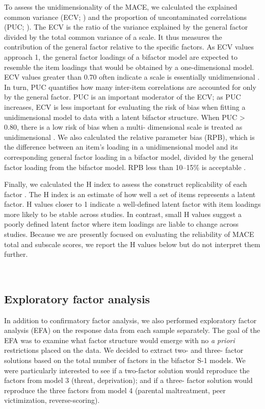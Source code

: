 \documentclass[letterpaper,man,natbib,noextraspace,floatsintext,longtable]{apa6}
\begin{document}
To assess the unidimensionality of the MACE, we calculated the explained common variance (ECV; \citealt{sijtsma2009use}) and the proportion of uncontaminated correlations (PUC; \citealt{reise2013multidimensionality}). The ECV is the ratio of the variance explained by the general factor divided by the total common variance of a scale. It thus measures the contribution of the general factor relative to the specific factors. As ECV values approach 1, the general factor loadings of a bifactor model are expected to resemble the item loadings that would be obtained by a one-dimensional model. ECV values greater than 0.70 often indicate a scale is essentially unidimensional \citep{rodriguez2016applying}. In turn, PUC quantifies how many inter-item correlations are accounted for only by the general factor. PUC is an important moderator of the ECV; as PUC increases, ECV is less important for evaluating the risk of bias when fitting a unidimensional model to data with a latent bifactor structure. When PUC > 0.80, there is a low risk of bias when a multi- dimensional scale is treated as unidimensional \citep{reise2013multidimensionality}. We also calculated the relative parameter bias (RPB), which is the difference between an item's loading in a unidimensional model and its corresponding general factor loading in a bifactor model, divided by the general factor loading from the bifactor model. RPB less than 10–15\% is acceptable \citep{muthen1987structural}.

Finally, we calculated the H index to assess the construct replicability of each factor \citep{hancock2001rethinking}. The H index is an estimate of how well a set of items represents a latent factor. H values closer to 1 indicate a well-defined latent factor with item loadings more likely to be stable across studies. In contrast, small H values suggest a poorly defined latent factor where item loadings are liable to change across studies. Because we are presently focused on evaluating the reliability of MACE total and subscale scores, we report the H values below but do not interpret them further.

{\begin{spacing}{0.2} \hfill \\ \end{spacing}} \subsection{Exploratory factor analysis}

In addition to confirmatory factor analysis, we also performed exploratory factor analysis (EFA) on the response data from each sample separately. The goal of the EFA was to examine what factor structure would emerge with no \emph{a priori} restrictions placed on the data. We decided to extract two- and three- factor solutions based on the total number of factors in the bifactor S-1 models. We were particularly interested to see if a two-factor solution would reproduce the factors from model 3 (threat, deprivation); and if a three- factor solution would reproduce the three factors from model 4 (parental maltreatment, peer victimization, reverse-scoring). 
\end{document}
